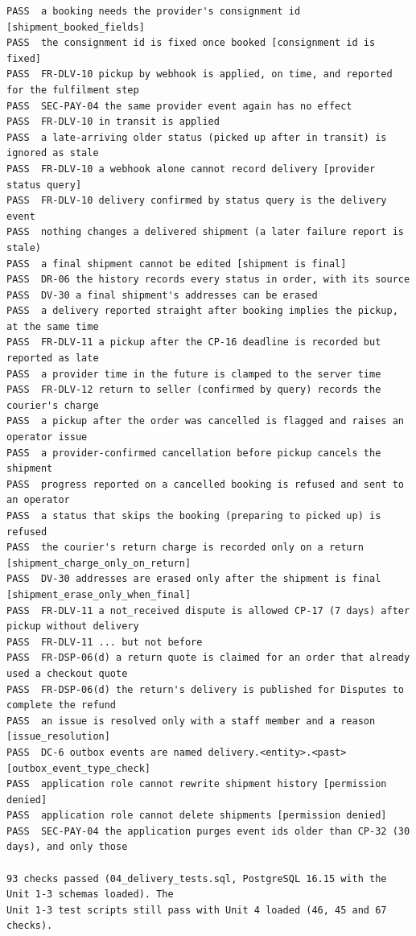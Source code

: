 \documentclass[11pt,a4paper]{article}
\begin{document}
{\begin{verbatim}
PASS  a booking needs the provider's consignment id [shipment_booked_fields]
PASS  the consignment id is fixed once booked [consignment id is fixed]
PASS  FR-DLV-10 pickup by webhook is applied, on time, and reported for the fulfilment step
PASS  SEC-PAY-04 the same provider event again has no effect
PASS  FR-DLV-10 in transit is applied
PASS  a late-arriving older status (picked up after in transit) is ignored as stale
PASS  FR-DLV-10 a webhook alone cannot record delivery [provider status query]
PASS  FR-DLV-10 delivery confirmed by status query is the delivery event
PASS  nothing changes a delivered shipment (a later failure report is stale)
PASS  a final shipment cannot be edited [shipment is final]
PASS  DR-06 the history records every status in order, with its source
PASS  DV-30 a final shipment's addresses can be erased
PASS  a delivery reported straight after booking implies the pickup, at the same time
PASS  FR-DLV-11 a pickup after the CP-16 deadline is recorded but reported as late
PASS  a provider time in the future is clamped to the server time
PASS  FR-DLV-12 return to seller (confirmed by query) records the courier's charge
PASS  a pickup after the order was cancelled is flagged and raises an operator issue
PASS  a provider-confirmed cancellation before pickup cancels the shipment
PASS  progress reported on a cancelled booking is refused and sent to an operator
PASS  a status that skips the booking (preparing to picked up) is refused
PASS  the courier's return charge is recorded only on a return [shipment_charge_only_on_return]
PASS  DV-30 addresses are erased only after the shipment is final [shipment_erase_only_when_final]
PASS  FR-DLV-11 a not_received dispute is allowed CP-17 (7 days) after pickup without delivery
PASS  FR-DLV-11 ... but not before
PASS  FR-DSP-06(d) a return quote is claimed for an order that already used a checkout quote
PASS  FR-DSP-06(d) the return's delivery is published for Disputes to complete the refund
PASS  an issue is resolved only with a staff member and a reason [issue_resolution]
PASS  DC-6 outbox events are named delivery.<entity>.<past> [outbox_event_type_check]
PASS  application role cannot rewrite shipment history [permission denied]
PASS  application role cannot delete shipments [permission denied]
PASS  SEC-PAY-04 the application purges event ids older than CP-32 (30 days), and only those

93 checks passed (04_delivery_tests.sql, PostgreSQL 16.15 with the Unit 1-3 schemas loaded). The
Unit 1-3 test scripts still pass with Unit 4 loaded (46, 45 and 67 checks).


\end{verbatim}}
\end{document}
